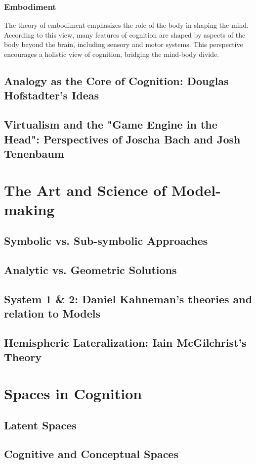 \documentclass[twocolumn]{article}
\begin{document}
\subsubsection{Embodiment}
The theory of embodiment emphasizes the role of the body in shaping the mind. According to this view, many features of cognition are shaped by aspects of the body beyond the brain, including sensory and motor systems. This perspective encourages a holistic view of cognition, bridging the mind-body divide.
\subsection{Analogy as the Core of Cognition: Douglas Hofstadter's Ideas}
\subsection{Virtualism and the "Game Engine in the Head": Perspectives of Joscha Bach and Josh Tenenbaum}

\section{The Art and Science of Model-making}
\subsection{Symbolic vs. Sub-symbolic Approaches}
\subsection{Analytic vs. Geometric Solutions}
\subsection{System 1 \& 2: Daniel Kahneman's theories and relation to Models}
\subsection{Hemispheric Lateralization: Iain McGilchrist's Theory}

\section{Spaces in Cognition}
\subsection{Latent Spaces}
\subsection{Cognitive and Conceptual Spaces}
\end{document}
